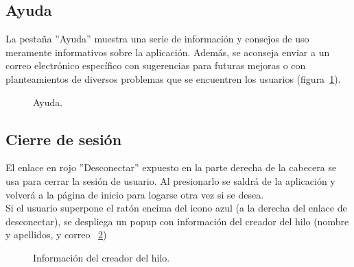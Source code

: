 \documentclass[a4paper, 12pt]{book}
\begin{document}
\subsection{Ayuda}
La pesta\~na ''Ayuda'' muestra una serie de informaci\'on y consejos de uso meramente informativos sobre la aplicaci\'on. Adem\'as, se aconseja enviar a un 
correo electr\'onico espec\'ifico con sugerencias para futuras mejoras o con planteamientos de diversos problemas que se encuentren los usuarios 
(figura~\ref{figura:ayuda}).
\begin{figure}[htbp] 
  \centering
  \caption{Ayuda.}
  \label{figura:ayuda}
\end{figure}


\subsection{Cierre de sesi\'on}
El enlace en rojo ''Desconectar'' expuesto en la parte derecha de la cabecera se usa para cerrar la sesi\'on de usuario. Al presionarlo se saldr\'a de la 
aplicaci\'on y volver\'a a la p\'agina de inicio para logarse otra vez si se desea.\\
Si el usuario superpone el rat\'on encima del icono azul (a la derecha del enlace de desconectar), se despliega un popup con informaci\'on del creador del 
hilo (nombre y apellidos, y correo ~\ref{figura:infocreador})
\begin{figure}[htbp] 
  \centering
  \caption{Informaci\'on del creador del hilo.}
  \label{figura:infocreador}
\end{figure}
\end{document}
